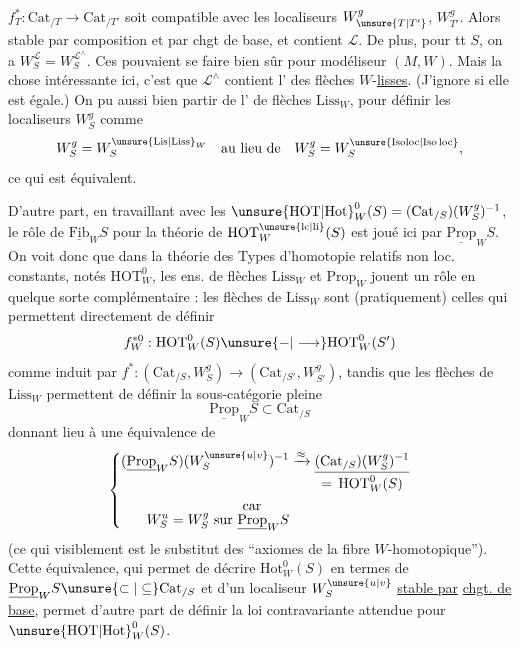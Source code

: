 $f_T^*:\mathrm{Cat}_{/T}\to\mathrm{Cat}_{/T'}$  soit compatible avec les localiseurs $W_{\unsure{T|T'}}^g$, $W_{T'}^g$. Alors   stable  par composition et par chgt de base, et  contient $\mathcal L$. De plus, pour tt $S$, on a $W_S^{\mathcal L}=W_S^{\mathcal L^\wedge}$.
Ces   pouvaient se faire bien sûr pour  modéliseur $(M,W)$. Mais la chose intéressante ici, c'est que $\mathcal L^\wedge$ contient l'  des flèches $W$-\uline{lisses}. (J'ignore si elle est égale.) On   pu
aussi bien partir de l' de flèches $\mathrm{Liss}_W$, pour définir les localiseurs $W_S^g$ comme
\[
W_S^g=W_S^{\unsure{\mathrm{Lis}|\mathrm{Liss}}_W}\quad\text{au lieu de}\quad
W_S^g=W_S^{\unsure{\mathrm{Isoloc}|\mathrm{Iso\,loc}}},
\]
ce qui est équivalent.

D'autre part, en travaillant avec les  $\unsure{\mathrm{HOT}|\mathrm{Hot}}_W^0(S)=(\mathrm{Cat}_{/S})(W_S^g)^{-1}$, le rôle de $\underline{\mathrm{Fib}}_W S$ pour la théorie de $\mathrm{HOT}^{\unsure{\mathrm{lc}|\mathrm{li}}}_W(S)$ est joué ici par $\underline{\mathrm{Prop}}_W S$. On voit donc que dans la théorie des Types d'homotopie relatifs non loc. constants, notés $\mathrm{HOT}_W^0$, les ens. de flèches $\mathrm{Liss}_W$ et $\mathrm{Prop}_W$ jouent un rôle en quelque sorte complémentaire : les flèches  de $\mathrm{Liss}_W$ sont (pratiquement) celles qui permettent directement de définir
\[
f_W^{*0}:\mathrm{HOT}_W^0(S)\unsure{-|\longrightarrow}\mathrm{HOT}_W^0(S')
\]
comme induit par $f^*:(\mathrm{Cat}_{/S},W_S^g)\longrightarrow(\mathrm{Cat}_{/S'},W_{S'}^g)$,
tandis que les flèches de $\mathrm{Liss}_W$ permettent de définir  la sous-catégorie pleine
\[
\underline{\mathrm{Prop}}_W S\subset\mathrm{Cat}_{/S}
\]
donnant lieu à une équivalence de 
\[
\left\{\begin{aligned}
(\underline{\mathrm{Prop}}_W S)(W_S^{\unsure{u|v}})^{-1}&\xrightarrow{\approx}
\underset{\displaystyle =\,\mathrm{HOT}_W^0(S)}{\underline{(\mathrm{Cat}_{/S})(W_S^g)^{-1}}}\\
\text{car}\qquad &\\[-5pt]
W_S^u=W_S^g\ \text{sur } \underline{\mathrm{Prop}}_W S&
\end{aligned}\right.
\]
(ce qui visiblement est le substitut  des ``axiomes de la  fibre $W$-homotopique''). Cette
équivalence, qui permet de décrire $\mathrm{Hot}_W^0(S)$ en termes de $\underline{\mathrm{Prop}}_W S\unsure{\subset|\subseteq}\mathrm{Cat}_{/S}$ et d'un localiseur $W_S^{\unsure{u|v}}$ \uline{stable par}  \uline{chgt. de base}, permet d'autre part de définir la loi contravariante attendue pour $\unsure{\mathrm{HOT}|\mathrm{Hot}}_W^0(S)$.

